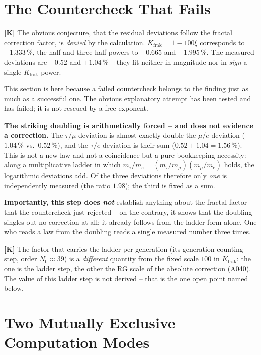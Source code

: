 \section{The Countercheck That Fails}

\textbf{[K]} The obvious conjecture, that the residual deviations follow the
fractal correction factor, is \emph{denied} by the calculation. $K_\text{frak}
= 1-100\xi$ corresponds to $-1{.}333\,\%$, the half and three-half powers to
$-0{.}665$ and $-1{.}995\,\%$. The measured deviations are $+0{.}52$ and
$+1{.}04\,\%$ -- they fit neither in magnitude nor in \emph{sign} a single
$K_\text{frak}$ power.

This section is here because a failed countercheck belongs to the finding just
as much as a successful one. The obvious explanatory attempt has been tested and
has failed; it is not rescued by a free exponent.

\textbf{The striking doubling is arithmetically forced -- and does not evidence a
correction.} The $\tau/\mu$ deviation is almost exactly double the $\mu/e$
deviation ($1{.}04\,\%$ vs.\ $0{.}52\,\%$), and the $\tau/e$ deviation is their
sum ($0{.}52 + 1{.}04 = 1{.}56\,\%$). This is not a new law and not a
coincidence but a pure bookkeeping necessity: along a multiplicative ladder in
which $m_\tau/m_e = (m_\tau/m_\mu)(m_\mu/m_e)$ holds, the logarithmic deviations
add. Of the three deviations therefore only \emph{one} is independently measured
(the ratio $1{.}98$); the third is fixed as a sum.

\textbf{Importantly, this step does \emph{not}} establish anything about the
fractal factor that the countercheck just rejected -- on the contrary, it shows
that the doubling singles out no correction at all: it already follows from the
ladder form alone. One who reads a law from the doubling reads a single measured
number three times.

\textbf{[K]} The factor that carries the ladder per generation (its
generation-counting step, order $N_0 \approx 39$) is a \emph{different} quantity
from the fixed scale $100$ in $K_\text{frak}$: the one is the ladder step, the
other the RG scale of the absolute correction (A040). The value of this ladder
step is not derived -- that is the one open point named below.

\section{Two Mutually Exclusive Computation Modes}

